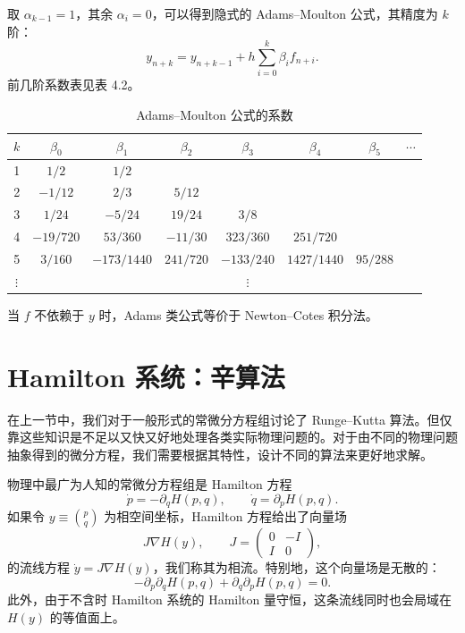 取 $\alpha_{k-1}=1$，其余 $\alpha_i=0$，可以得到隐式的 Adams--Moulton 公式，其精度为 $k$ 阶：
\begin{equation}
 y_{n+k}=y_{n+k-1}+h\sum_{i=0}^{k}\beta_i f_{n+i}.
\tag{4.3.42}
\end{equation}
前几阶系数表见表 4.2。

\begin{table}[htbp]
\centering
\caption{Adams--Moulton 公式的系数}
\begin{tabular}{c c c c c c c c}
\toprule
$k$&$\beta_0$&$\beta_1$&$\beta_2$&$\beta_3$&$\beta_4$&$\beta_5$&$\cdots$\\
\midrule
1&$1/2$&$1/2$&&&&&\\
2&$-1/12$&$2/3$&$5/12$&&&&\\
3&$1/24$&$-5/24$&$19/24$&$3/8$&&&\\
4&$-19/720$&$53/360$&$-11/30$&$323/360$&$251/720$&&\\
5&$3/160$&$-173/1440$&$241/720$&$-133/240$&$1427/1440$&$95/288$&\\
$\vdots$&&&&$\vdots$&&&\\
\bottomrule
\end{tabular}
\end{table}

当 $f$ 不依赖于 $y$ 时，Adams 类公式等价于 Newton--Cotes 积分法。

\section{Hamilton 系统：辛算法}

在上一节中，我们对于一般形式的常微分方程组讨论了 Runge--Kutta 算法。但仅靠这些知识是不足以又快又好地处理各类实际物理问题的。对于由不同的物理问题抽象得到的微分方程，我们需要根据其特性，设计不同的算法来更好地求解。

物理中最广为人知的常微分方程组是 Hamilton 方程
\begin{equation}
\dot p=-\partial_qH(p,q),\qquad
\dot q=\partial_pH(p,q).
\tag{4.4.1}
\end{equation}
如果令 $y\equiv\binom pq$ 为相空间坐标，Hamilton 方程给出了向量场
\begin{equation}
J\nabla H(y),\qquad
J=\begin{pmatrix}0&-I\\I&0\end{pmatrix},
\tag{4.4.2}
\end{equation}
的流线方程 $\dot y=J\nabla H(y)$，我们称其为相流。特别地，这个向量场是无散的：
\begin{equation}
-\partial_p\partial_qH(p,q)+\partial_q\partial_pH(p,q)=0.
\tag{4.4.3}
\end{equation}
此外，由于不含时 Hamilton 系统的 Hamilton 量守恒，这条流线同时也会局域在 $H(y)$ 的等值面上。

